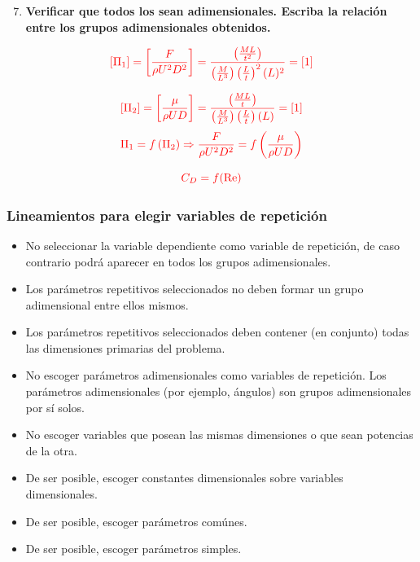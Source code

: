 \documentclass[t]{beamer}
\begin{document}
\begin{frame}
\begin{enumerate}
\setcounter{enumi}{6}
\item \textbf{Verificar que todos los  sean adimensionales. Escriba la relación entre los grupos adimensionales obtenidos.}
\end{enumerate}
{\color{red}{Verificación:}}

$$\color{red}{
\left[\Pi_{1}\right]=\left[\frac{F}{\rho U^{2} D^{2}}\right]=\frac{\left(\frac{M L}{t^{2}}\right)}{\left(\frac{M}{L^{3}}\right)\left(\frac{L}{t}\right)^{2}(L)^{2}}=[1]
}$$

$$\color{red}{
\left[\Pi_{2}\right]=\left[\frac{\mu}{\rho U D}\right]=\frac{\left(\frac{M L}{t}\right)}{\left(\frac{M}{L^{3}}\right)\left(\frac{L}{t}\right)(L)}=[1]
}$$
{\color{red}{La relación funcional entre los dos grupos será:}}
$$\color{red}{
\Pi_{1}=f\left(\Pi_{2}\right)
} \Rightarrow \frac{F}{\rho U^{2} D^{2}}=f\left(\frac{\mu}{\rho U D}\right)$$
{}

$$\color{red}{C_D = f(\operatorname{Re})}$$
 
\end{frame}
\begin{frame}[t]
\frametitle{Lineamientos para elegir variables de repetición}
\begin{small}
\begin{itemize}
\item No seleccionar la variable dependiente como variable de repetición, de caso contrario podrá aparecer en todos los grupos adimensionales.
\item Los parámetros repetitivos seleccionados no deben formar un grupo adimensional entre ellos mismos.
\item Los parámetros repetitivos seleccionados deben contener (en conjunto) todas las dimensiones primarias del problema.
\item No escoger parámetros adimensionales como variables de repetición. Los parámetros adimensionales (por ejemplo, ángulos) son grupos adimensionales por sí solos.
\item No escoger variables que posean las mismas dimensiones o que sean potencias de la otra.
\item De ser posible, escoger constantes dimensionales sobre variables dimensionales.
\item De ser posible, escoger parámetros comúnes.
\item De ser posible, escoger parámetros simples.
\end{itemize}
\end{small}
\end{frame}
\end{document}
